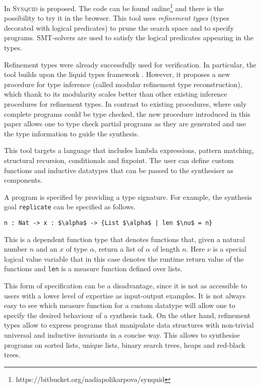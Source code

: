 In \cite{SynquidPaper} \textsc{Synquid} is proposed. The code can be found online\footnote{https://bitbucket.org/nadiapolikarpova/synquid} and there is the possibility to try it in the browser.
This tool uses \emph{refinement types} (types decorated with logical predicates) to prune the search space and to specify programs. SMT-solvers are used to satisfy the logical predicates appearing in the types.

Refinement types were already successfully used for verification. In particular, the tool builds upon the liquid types framework \cite{LiquidTypes}. However, it proposes a new procedure for type inference (called modular refinement type reconstruction), which thank to its modularity scales better than other existing inference procedures for refinement types. In contrast to existing procedures, where only complete programs could be type checked, the new procedure introduced in this paper allows one to type check partial programs as they are generated and use the type information to guide the synthesis.

This tool targets a language that includes lambda expressions, pattern matching, structural recursion, conditionals and fixpoint.
The user can define custom functions and inductive datatypes that can be passed to the synthesiser as components.

A program is specified by providing a type signature. For example, the synthesis goal \lstinline!replicate! can be specified as follows.
\begin{lstlisting}[style=plain]
n : Nat -> x : $\alpha$ -> {List $\alpha$ | len $\nu$ = n}
\end{lstlisting}
This is a dependent function type that denotes functions that, given a natural number $n$ and an $x$ of type $\alpha$, return a list of $\alpha$ of length $n$. Here $\nu$ is a special logical value variable that in this case denotes the runtime return value of the functions and \lstinline!len! is a measure function defined over lists.

This form of specification can be a disadvantage, since it is not as accessible to users with a lower level of expertise as input-output examples. It is not always easy to see which measure function for a custom datatype will allow one to specify the desired behaviour of a synthesis task.
On the other hand, refinement types allow to express programs that manipulate data structures with non-trivial universal and inductive invariants in a concise way. This allows to synthesise programs on sorted lists, unique lists, binary search trees, heaps and red-black trees.

